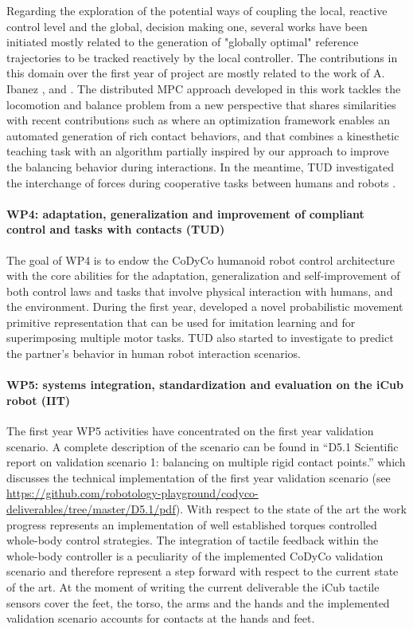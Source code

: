 \documentclass[12pt,a4paper,twoside]{article}
\begin{document}
Regarding the exploration of the potential ways of coupling the local, reactive control level and the global, decision making one, several works have been initiated mostly related to the generation of "globally optimal" reference trajectories to be tracked reactively by the local controller. The contributions in this domain over the first year of project are mostly related to the work of A. Ibanez \cite{ibanez2013}, \cite{ibanez2014-icra} and \cite{ibanez2014-ark}. The distributed MPC approach developed in this work tackles the locomotion and balance problem from a new perspective that shares similarities with recent contributions such as \cite{mordatch2012} where an optimization framework enables an automated generation of rich contact behaviors, and \cite{ott2013} that combines a kinesthetic teaching task with an algorithm partially inspired by our approach to improve the balancing behavior during interactions. In the meantime, TUD investigated the interchange of forces during cooperative tasks between humans and robots \cite{berger2013}.

\paragraph*{WP4: adaptation, generalization and improvement of compliant control and tasks with contacts (TUD)}

The goal of WP4 is to endow the CoDyCo
humanoid robot control architecture with the
core abilities for the adaptation, generalization
and self-improvement of both control laws and
tasks that involve physical interaction with
humans, and the environment.
During the first year, developed a novel 
probabilistic movement primitive representation that
can be used for imitation learning and for superimposing multiple motor tasks. 
TUD also started to investigate to predict the partner's behavior in 
human robot interaction scenarios. 

\paragraph*{WP5: systems integration, standardization and evaluation on the iCub robot (IIT)}

The first year WP5 activities have concentrated on the first year validation scenario. A complete description of the scenario can be found in ``D5.1 Scientific report on validation scenario 1: balancing on multiple rigid contact points.'' which discusses the technical implementation of the first year validation scenario (see \url{https://github.com/robotology-playground/codyco-deliverables/tree/master/D5.1/pdf}). With respect to the state of the art the work progress represents an implementation of well established torques controlled whole-body control strategies. The integration of tactile feedback within the whole-body controller is a peculiarity of the implemented CoDyCo validation scenario and therefore represent a step forward with respect to the current state of the art. At the moment of writing the current deliverable the iCub tactile sensors cover the feet, the torso, the arms and the hands and the implemented validation scenario accounts for contacts at the hands and feet.
\end{document}

